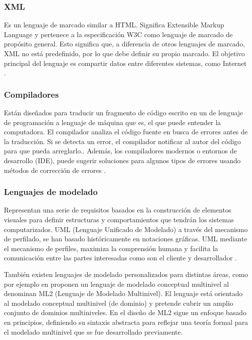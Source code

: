 \documentclass[12pt,a4paper,final, xcolor=table, table]{article}
\begin{document}
    \subsubsection{XML}
    
    Es un lenguaje de marcado similar a HTML. Significa Extensible Markup Language y pertenece a la especificación W3C como lenguaje de marcado de propósito general. Esto significa que, a diferencia de otros lenguajes de marcado, XML no está predefinido, por lo que debe definir su propio marcado. El objetivo principal del lenguaje es compartir datos entre diferentes sistemas, como Internet \parencite{XML-based}.
    
    \subsubsection{Compiladores}
    Están diseñados para traducir un fragmento de código escrito en un de lenguaje de programación a lenguaje de máquina que es, el que puede entender la computadora. El compilador analiza el código fuente en busca de errores antes de la traducción. Si se detecta un error, el compilador
    notificar al autor del código para que pueda arreglarlo.. Además, los compiladores modernos o entornos de desarrollo (IDE), puede sugerir soluciones para algunos tipos de errores usando métodos de corrección de errores \parencite{CoEdit}.
    
    \subsubsection{Lenguajes de modelado}
    Representan una serie de requisitos basados en la construcción de elementos visuales para definir estructuras y comportamientos que tendrán los sistemas computarizados. UML (Lenguaje Unificado de Modelado) a través del mecanismo de perfilado, se han basado históricamente en notaciones gráficas. UML mediante el mecanismo de perfiles, maximiza la comprensión humana y facilita la comunicación entre las partes interesadas como son el cliente y desarrollador \parencite{Blended}. 
    
    También existen lenguajes de modelado personalizados para distintas áreas, como por ejemplo en \parencite{Multi-level} proponen un lenguaje de modelado conceptual multinivel al denominan ML2 (Lenguaje de Modelado Multinivel). El lenguaje está orientado al modelado conceptual multinivel (de dominio) y pretende cubrir un amplio conjunto de dominios multiniveles. En el diseño de ML2 sigue un enfoque basado en principios, definiendo su sintaxis abstracta para reflejar una teoría formal para el modelado multinivel que se fue desarrollado previamente.
	
\end{document}
